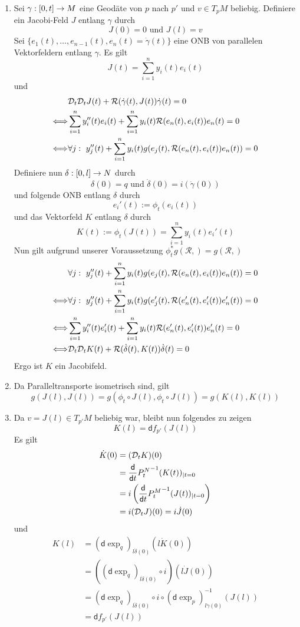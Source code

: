 \documentclass{book}
\renewcommand{\i}{^{-1}}
\renewcommand{\d}{\textsf{d}}
\newcommand{\Rc}{\mathcal{R}}
\begin{document}
\begin{Beweis}{}
\begin{enumerate}[1.)]
\item Sei $\gamma : [0,t] \overset{}{\rightarrow} M$ eine Geodäte von $p$ nach $p'$ und $v \in T_pM$ beliebig. Definiere ein Jacobi-Feld $J$ entlang $\gamma$ durch
\[ J(0) = 0 \text{ und } J(l) = v \]
Sei $\{e_1(t), \ldots, e_{n-1}(t), e_n(t) = \dot{\gamma}(t)\}$ eine ONB von parallelen Vektorfeldern entlang $\gamma$. Es gilt
\[ J(t) = \sum_{i = 1}^n y_i(t) e_i(t) \]
und
\begin{align*}
&\D_t\D_tJ(t) + \Rc( \dot{\gamma}(t), J(t)) \dot{\gamma}(t) = 0\\
\Gdw{} & \sum_{i = 1}^{n} y_i''(t) e_i(t) + \sum_{i = 1}^ny_i(t)\Rc (e_n(t), e_i(t) ) e_n(t) = 0\\
\Gdw{} &  \forall j:~ y_j''(t) + \sum_{i = 1}^ny_i(t)g(e_j(t), \Rc (e_n(t), e_i(t) ) e_n(t)) = 0 
\end{align*}
Definiere nun $\delta : [0,l] \overset{}{\rightarrow} N$ durch
\[ \delta(0) = q \text{ und } \dot{\delta}(0) = i(\dot{\gamma}(0)) \]
und folgende ONB entlang $\delta$ durch
\[ e_i'(t) := \phi_t(e_i(t)) \]
und das Vektorfeld $K$ entlang $\delta$ durch
\[ K(t) := \phi_t(J(t)) = \sum_{i = 1}^n y_i(t)e_i'(t) \]
Nun gilt aufgrund unserer Voraussetzung $\phi_t^*g(\Rc,) = g(\Rc,)$
\begin{align*}
&  \forall j:~ y_j''(t) + \sum_{i = 1}^ny_i(t)g(e_j(t), \Rc (e_n(t), e_i(t) ) e_n(t)) = 0 \\
\Gdw{} &  \forall j:~ y_j''(t) + \sum_{i = 1}^ny_i(t)g(e'_j(t), \Rc (e'_n(t), e'_i(t) ) e'_n(t)) = 0\\
\Gdw{} & \sum_{i = 1}^{n} y_i''(t) e'_i(t) + \sum_{i = 1}^ny_i(t)\Rc (e'_n(t), e'_i(t) ) e'_n(t) = 0\\
\Gdw{} &\D_t\D_tK(t) + \Rc( \dot{\delta}(t), K(t)) \dot{\delta}(t) = 0
\end{align*}
Ergo ist $K$ ein Jacobifeld.
\item Da Paralleltransporte isometrisch sind, gilt
\[ g(J(l), J(l)) = g(\phi_t\circ J(l),\phi_t\circ J(l)) = g(K(l), K(l)) \]
\item Da $v = J(l) \in T_{p'}M$ beliebig war, bleibt nun folgendes zu zeigen
\[ K(l) = \d f_{p'}(J(l)) \]
Es gilt
\begin{align*}
\dot{K}(0) &= (\D_tK)(0) \\
&= \frac{\d}{\d t} {P^N_t}\i(K(t))_{|t = 0}\\
&= i\klam{ \frac{\d}{\d t} {P^M_t}\i (J(t))_{|t = 0} }\\
&= i(\D_tJ)(0) = i\dot{J}(0) 
\end{align*}
und
\begin{align*}
K(l) &= (\d \exp_q)_{l\dot{\delta}(0)} (l\dot{K}(0))\\
&= ((\d\exp_q)_{l\dot{\delta}(0)}\circ i)(l\dot{J}(0))\\
&= (\d \exp_q)_{l\dot{\delta}(0)} \circ i \circ (\d \exp_p)\i_{l\dot{\gamma}(0)} (J(l))\\
&= \d f_{p'}(J(l))
\end{align*}
\end{enumerate}
\end{Beweis}
\end{document}
